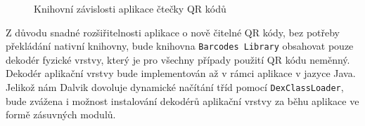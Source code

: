 \begin{figure}[H]
  \begin{center}
    \caption{Knihovní závislosti aplikace čtečky QR kódů}
    \label{QRReaderApplicationLibraryDependency}
  \end{center}
\end{figure}

Z důvodu snadné rozšiřitelnosti aplikace o nově čitelné QR kódy, bez potřeby
překládání nativní knihovny, bude knihovna \texttt{Barcodes Library} obsahovat
pouze dekodér fyzické vrstvy, který je pro všechny případy použití QR kódu
neměnný. Dekodér aplikační vrstvy bude implementován až v rámci aplikace v
jazyce Java. Jelikož nám Dalvik dovoluje dynamické načítání tříd pomocí \texttt{DexClassLoader}, bude zvážena i
možnost instalování dekodérů aplikační vrstvy za běhu aplikace ve formě zásuvných modulů.

